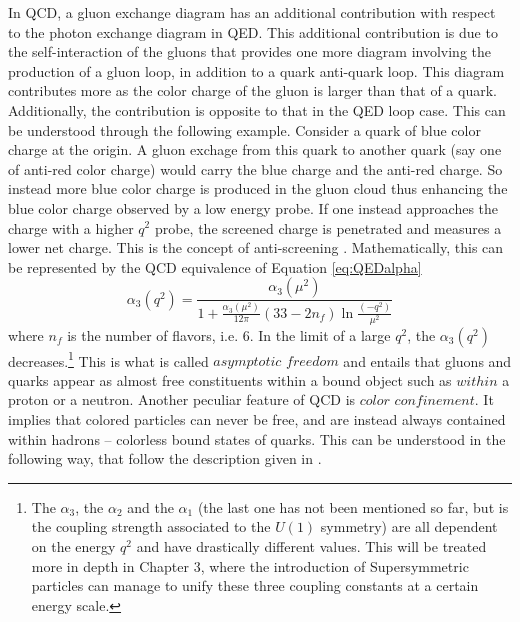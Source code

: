 \newpara
\noindent\justify
In QCD, a gluon exchange diagram has an additional contribution with respect to the photon exchange diagram in QED. 
This additional contribution is due to the self-interaction of the gluons that provides one more diagram involving the production of a gluon loop, in addition to a quark anti-quark loop. 
This diagram contributes more as the color charge of the gluon is larger than that of a quark. 
Additionally, the contribution is opposite to that in the QED loop case. 
This can be understood through the following example. Consider a quark of blue color charge at the origin. 
A gluon exchage from this quark to another quark (say one of anti-red color charge) would carry the blue charge and the anti-red charge. 
So instead more blue color charge is produced in the gluon cloud thus enhancing the blue color charge observed by a low energy probe. 
If one instead approaches the charge with a higher $q^{2}$ probe, the screened charge is penetrated and measures a lower net charge.
This is the concept of anti-screening \cite{Kane:2244793}.
Mathematically, this can be represented by the QCD equivalence of Equation \ref{eq:QEDalpha} 
\begin{equation}
\alpha_{3}(q^{2})=\frac{\alpha_{3}(\mu^{2})}{1+\frac{\alpha_{3}(\mu^{2})}{12\pi}(33-2 n_{f})\ln\frac{(-q^{2})}{\mu^{2}}}
\end{equation}
where $n_{f}$ is the number of flavors, i.e. 6. 
In the limit of a large $q^{2}$, the $\alpha_{3}(q^{2})$ decreases.\footnote{The $\alpha_{3}$, the $\alpha_{2}$ and the $\alpha_{1}$ (the last one has not been mentioned so far, but is the coupling strength associated to the $U(1)$ symmetry) are all dependent on the energy $q^{2}$ and have drastically different values. This will be treated more in depth in Chapter 3, where the introduction of Supersymmetric particles can manage to unify these three coupling constants at a certain energy scale.} 
This is what is called $asymptotic$ $freedom$ \cite{Gross:1973id,Politzer:1973fx} and entails that gluons and quarks appear as almost free constituents within a bound object such as $within$ a proton or a neutron. 
\newpara
\noindent\justify
Another peculiar feature of QCD is $color$ $confinement$. 
It implies that colored particles can never be free, and are instead always contained within hadrons -- colorless bound states of quarks. 
This can be understood in the following way, that follow the description given in \cite{Kane:2244793}. 
